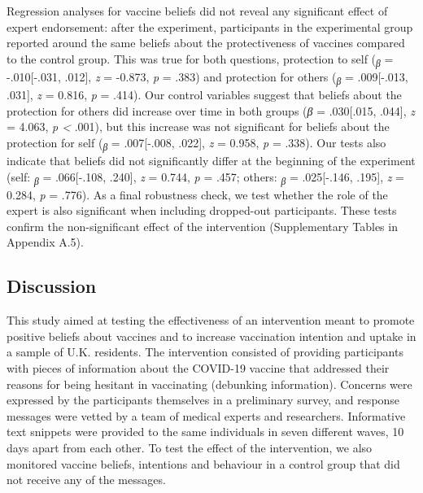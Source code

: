 \documentclass[authordate, empirical]{jote-new-article}
\begin{document}
	Regression analyses for vaccine beliefs did not reveal any significant effect of expert endorsement: after the experiment, participants in the experimental group reported around the same beliefs about the protectiveness of vaccines compared to the control group. This was true for both questions, protection to self (\textsubscript{\emph{β }}= -.010[-.031, .012], \emph{z }= -0.873, \emph{p }= .383) and protection for others (\textsubscript{\emph{β }}= .009[-.013, .031], \emph{z }= 0.816, \emph{p }= .414). Our control variables suggest that beliefs about the protection for others did increase over time in both groups (\emph{β }= .030[.015, .044], \emph{z }= 4.063, \emph{p < }.001), but this increase was not significant for beliefs about the protection for self (\textsubscript{\emph{β }}= .007[-.008, .022], \emph{z }= 0.958, \emph{p }= .338). Our tests also indicate that beliefs did not significantly differ at the beginning of the experiment (self: \textsubscript{\emph{β }}= .066[-.108, .240], \emph{z }= 0.744, \emph{p }= .457; others: \textsubscript{\emph{β }}= .025[-.146, .195], \emph{z }= 0.284, \emph{p }= .776). As a final robustness check, we test whether the role of the expert is also significant when including dropped-out participants. These tests confirm the non-significant effect of the intervention (Supplementary Tables in Appendix A.5).



	\subsection{Discussion}



	This study aimed at testing the effectiveness of an intervention meant to promote positive beliefs about vaccines and to increase vaccination intention and uptake in a sample of U.K. residents. The intervention consisted of providing participants with pieces of information about the COVID-19 vaccine that addressed their reasons for being hesitant in vaccinating (debunking information). Concerns were expressed by the participants themselves in a preliminary survey, and response messages were vetted by a team of medical experts and researchers. Informative text snippets were provided to the same individuals in seven different waves, 10 days apart from each other. To test the effect of the intervention, we also monitored vaccine beliefs, intentions and behaviour in a control group that did not receive any of the messages.
\end{document}
